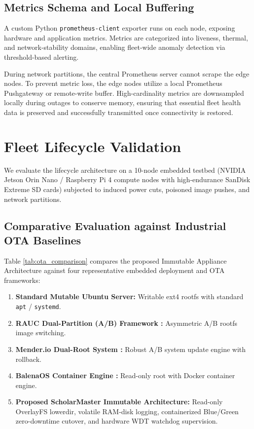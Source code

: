 \documentclass[conference]{IEEEtran}
\begin{document}
\subsection{Metrics Schema and Local Buffering}
A custom Python \texttt{prometheus-client} exporter runs on each node, exposing hardware and application metrics. Metrics are categorized into liveness, thermal, and network-stability domains, enabling fleet-wide anomaly detection via threshold-based alerting.

During network partitions, the central Prometheus server cannot scrape the edge nodes. To prevent metric loss, the edge nodes utilize a local Prometheus Pushgateway or remote-write buffer. High-cardinality metrics are downsampled locally during outages to conserve memory, ensuring that essential fleet health data is preserved and successfully transmitted once connectivity is restored.

\section{Fleet Lifecycle Validation}

We evaluate the lifecycle architecture on a 10-node embedded testbed (NVIDIA Jetson Orin Nano / Raspberry Pi 4 compute nodes with high-endurance SanDisk Extreme SD cards) subjected to induced power cuts, poisoned image pushes, and network partitions.

\subsection{Comparative Evaluation against Industrial OTA Baselines}
Table \ref{tab:ota_comparison} compares the proposed Immutable Appliance Architecture against four representative embedded deployment and OTA frameworks:
\begin{enumerate}
    \item \textbf{Standard Mutable Ubuntu Server:} Writable ext4 rootfs with standard \texttt{apt} / \texttt{systemd}.
    \item \textbf{RAUC Dual-Partition (A/B) Framework \cite{b25}:} Asymmetric A/B rootfs image switching.
    \item \textbf{Mender.io Dual-Root System \cite{b26}:} Robust A/B system update engine with rollback.
    \item \textbf{BalenaOS Container Engine \cite{b27}:} Read-only root with Docker container engine.
    \item \textbf{Proposed ScholarMaster Immutable Architecture:} Read-only OverlayFS lowerdir, volatile RAM-disk logging, containerized Blue/Green zero-downtime cutover, and hardware WDT watchdog supervision.
\end{enumerate}
\end{document}
